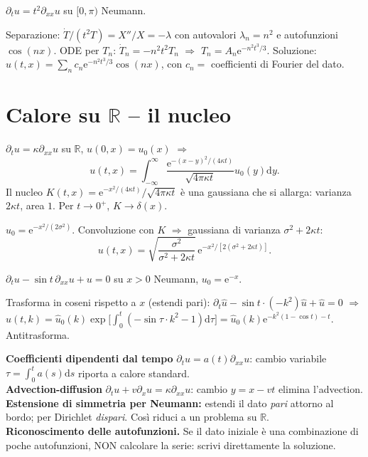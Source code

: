 \documentclass[11pt,a4paper,openany]{book}
\theoremstyle{definition}
\newcommand{\R}{\mathbb{R}}
\newcommand{\dd}{\mathrm{d}}
\newcommand{\eu}{\mathrm{e}}
\begin{document}
\begin{esempio}
$\partial_t u=t^2\partial_{xx}u$ su $[0,\pi)$ Neumann.

Separazione: $\dot T/(t^2 T)=X''/X=-\lambda$ con autovalori $\lambda_n=n^2$ e autofunzioni $\cos(nx)$. ODE per $T_n$: $\dot T_n=-n^2 t^2 T_n$ $\Rightarrow$ $T_n=A_n\eu^{-n^2 t^3/3}$. Soluzione: $u(t,x)=\sum_n c_n\eu^{-n^2 t^3/3}\cos(nx)$, con $c_n=$ coefficienti di Fourier del dato.
\end{esempio}

\section{Calore su $\R$ -- il nucleo}

\begin{teoria}
$\partial_t u=\kappa\partial_{xx}u$ su $\R$, $u(0,x)=u_0(x)$ $\Rightarrow$
$$u(t,x)=\int_{-\infty}^\infty\frac{\eu^{-(x-y)^2/(4\kappa t)}}{\sqrt{4\pi\kappa t}}u_0(y)\dd y.$$
Il nucleo $K(t,x)=\eu^{-x^2/(4\kappa t)}/\sqrt{4\pi\kappa t}$ \`e una gaussiana che si allarga: varianza $2\kappa t$, area $1$. Per $t\to 0^+$, $K\to\delta(x)$.
\end{teoria}

\begin{esempio}
$u_0=\eu^{-x^2/(2\sigma^2)}$. Convoluzione con $K$ $\Rightarrow$ gaussiana di varianza $\sigma^2+2\kappa t$:
$$u(t,x)=\sqrt{\frac{\sigma^2}{\sigma^2+2\kappa t}}\,\eu^{-x^2/[2(\sigma^2+2\kappa t)]}.$$
\end{esempio}

\begin{esempio}
$\partial_t u-\sin t\,\partial_{xx}u+u=0$ su $x>0$ Neumann, $u_0=\eu^{-x}$.

Trasforma in coseni rispetto a $x$ (estendi pari): $\partial_t \hat u-\sin t\cdot(-k^2)\hat u+\hat u=0$ $\Rightarrow$ $\hat u(t,k)=\hat u_0(k)\exp\big[\int_0^t(-\sin\tau\cdot k^2-1)\dd\tau\big]=\hat u_0(k)\eu^{-k^2(1-\cos t)-t}$. Antitrasforma.
\end{esempio}

\begin{trucco}
\textbf{Coefficienti dipendenti dal tempo} $\partial_t u=a(t)\partial_{xx}u$: cambio variabile $\tau=\int_0^t a(s)\dd s$ riporta a calore standard.\\
\textbf{Advection-diffusion} $\partial_t u+v\partial_x u=\kappa\partial_{xx}u$: cambio $y=x-vt$ elimina l'advection.\\
\textbf{Estensione di simmetria per Neumann:} estendi il dato \emph{pari} attorno al bordo; per Dirichlet \emph{dispari}. Cos\`i riduci a un problema su $\R$.\\
\textbf{Riconoscimento delle autofunzioni.} Se il dato iniziale \`e una combinazione di poche autofunzioni, NON calcolare la serie: scrivi direttamente la soluzione.
\end{trucco}
\end{document}
